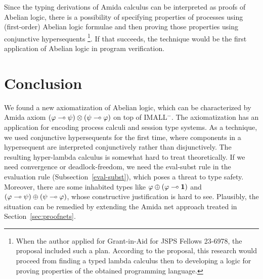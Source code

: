 Since the typing derivations of Amida calculus can be interpreted as
proofs of Abelian logic, there is a possibility of specifying properties
of processes using (first-order) Abelian logic formulae and then
proving those properties using conjunctive hypersequents%
\footnote{When the author applied for Grant-in-Aid for JSPS Fellows
23-6978, the proposal included such a plan.  According to the proposal,
this research would proceed from finding a typed lambda calculus then to
developing a logic for proving properties of the obtained programming
language.}.
If that succeeds, the technique would be the first application of
Abelian logic in program verification.

\section{Conclusion}

We found a new axiomatization of Abelian logic, which can be
characterized by Amida axiom
$(\varphi\multimap\psi)\otimes(\psi\multimap\varphi)$ on top of IMALL$^-$.
The axiomatization has an application for encoding process calculi and
session type systems.
As a technique, we used conjunctive hypersequents for the first time,
where components in a hypersequent are interpreted conjunctively rather
than disjunctively.
The resulting hyper-lambda calculus is somewhat hard to treat
theoretically.
If we need convergence or deadlock-freedom, we need the eval-subst rule in the evaluation rule
(Subsection~\ref{eval-subst}),
which poses a threat to type safety.
Moreover, there are some inhabited types like $\varphi\oplus
(\varphi\multimap\mathbf{1})$ and $(\varphi\multimap\psi)\oplus(\psi\multimap\varphi)$,
whose constructive justification is hard to see.
Plausibly, the situation can be remedied by extending the Amida net
approach treated in Section~\ref{sec:proofnets}.
